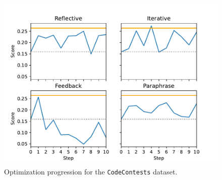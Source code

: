 \begin{table}[htbp]
\begin{tabular}{|c||c|c|c|c|}
\end{tabular}
\end{table}
\begin{figure}
    \includegraphics[width=\linewidth]{codecontests.pdf}
    \caption{Optimization progression for the \texttt{CodeContests} dataset.}
    \label{fig:codecontests}
\end{figure}

